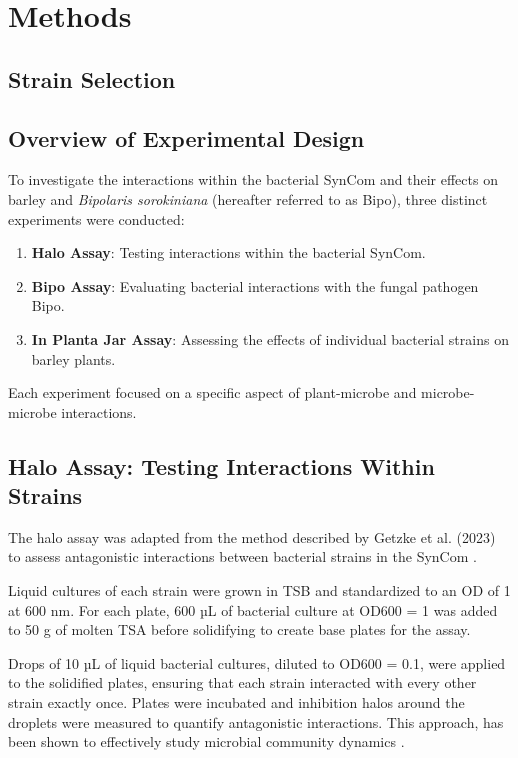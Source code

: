 \section{Methods}

\subsection{Strain Selection}



\subsection{Overview of Experimental Design}
To investigate the interactions within the bacterial \ac{SynCom} and their effects on barley and \textit{Bipolaris sorokiniana} (hereafter referred to as Bipo), three distinct experiments were conducted:
\begin{enumerate}
    \item \textbf{Halo Assay}: Testing interactions within the bacterial \ac{SynCom}.
    \item \textbf{Bipo Assay}: Evaluating bacterial interactions with the fungal pathogen \ac{Bipo}.
    \item \textbf{In Planta Jar Assay}: Assessing the effects of individual bacterial strains on barley plants.
\end{enumerate}
Each experiment focused on a specific aspect of plant-microbe and microbe-microbe interactions.


\subsection{Halo Assay: Testing Interactions Within Strains}
The halo assay was adapted from the method described by Getzke et al. (2023) to assess antagonistic interactions between bacterial strains in the \ac{SynCom} \cite{getzke2023Cofunctioning}. 

Liquid cultures of each strain were grown in \ac{TSB} and standardized to an \ac{OD} of 1 at 600 nm. For each plate, 600 µL of bacterial culture at OD600 = 1 was added to 50 g of molten \ac{TSA} before solidifying to create base plates for the assay.

Drops of 10 µL of liquid bacterial cultures, diluted to OD600 = 0.1, were applied to the solidified plates, ensuring that each strain interacted with every other strain exactly once. Plates were incubated and inhibition halos around the droplets were measured to quantify antagonistic interactions. This approach,  has been shown to effectively study microbial community dynamics \cite{getzke2023Cofunctioning}.

